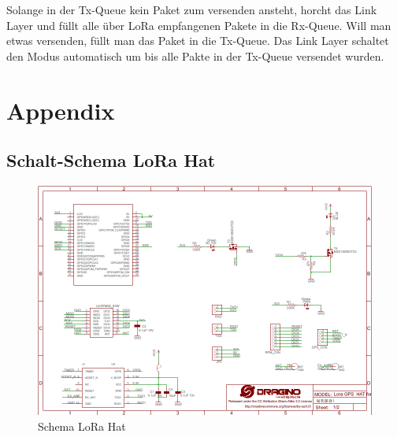 \documentclass[ngerman, a4paper, 11pt]{scrartcl}
\begin{document}
Solange in der Tx-Queue kein Paket zum versenden ansteht, horcht das Link Layer und füllt alle über LoRa empfangenen Pakete in die Rx-Queue.
Will man etwas versenden, füllt man das Paket in die Tx-Queue. Das Link Layer schaltet den Modus automatisch um bis alle Pakte in der Tx-Queue versendet wurden.



\appendix
\section{Appendix}
\subsection{Schalt-Schema LoRa Hat}\label{app:schma}
\begin{figure}[H]
	\centering
	\includegraphics[width=0.99\linewidth]{./pic/GPS_HAT}
	\caption{Schema LoRa Hat}
	\label{fig:schema}
\end{figure}
\end{document}
